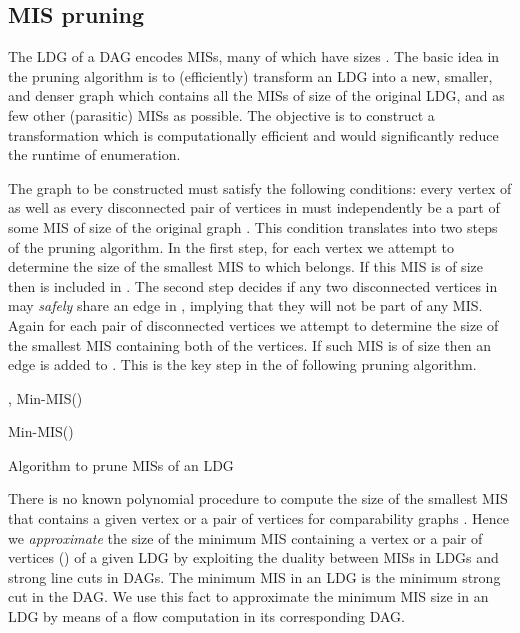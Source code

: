 \documentclass[journal]{IEEEtran}
\begin{document}
\subsection{MIS pruning}
The LDG of a DAG encodes MISs, many of which have sizes .  The basic idea in the pruning algorithm is to (efficiently) transform an LDG into a new, smaller, and denser graph  which contains all the MISs of size  of the original LDG, and as few other (parasitic) MISs as possible.  The objective is to construct a transformation which is computationally efficient and would significantly reduce the runtime of enumeration.

The graph  to be constructed must satisfy the  following conditions: every vertex  of  as well as every disconnected pair of vertices in  must independently be a part of some MIS of size  of the original graph . This condition  translates into two steps of the pruning algorithm. In the first step, for each vertex  we attempt to determine the size of the smallest MIS to which  belongs. If this MIS is of size  then  is included in . The second step decides if any two disconnected vertices in  may \textit{safely} share an edge in , implying that they will not be part of any MIS.  Again for each pair of disconnected vertices  we attempt to determine the size of the smallest MIS containing both of the vertices. If such MIS is of size  then an edge  is added to . This is the key step in the  of following pruning algorithm.

\begin{algorithm} 
    \BlankLine , \;  {  Min-MIS()\; \If{} { \; } }

{
 Min-MIS()\;
\If{}
{
\;
}
}

\;
\;
\Return \;
\caption{Algorithm to prune MISs of an LDG}
\label{algo:prune} 
\end{algorithm} 

There is no known polynomial procedure to compute the size of the smallest MIS that contains a given vertex or a pair of vertices for comparability graphs \cite{corneil1984clustering}. Hence we \emph{approximate} the size of the minimum MIS containing a vertex  or a pair of vertices () of a given LDG by exploiting the duality between MISs in LDGs and strong line cuts in DAGs. The minimum MIS in an LDG is the minimum strong cut in the DAG. We use this fact to approximate the minimum MIS size in an LDG by means of a flow computation in its corresponding DAG.
\end{document}
